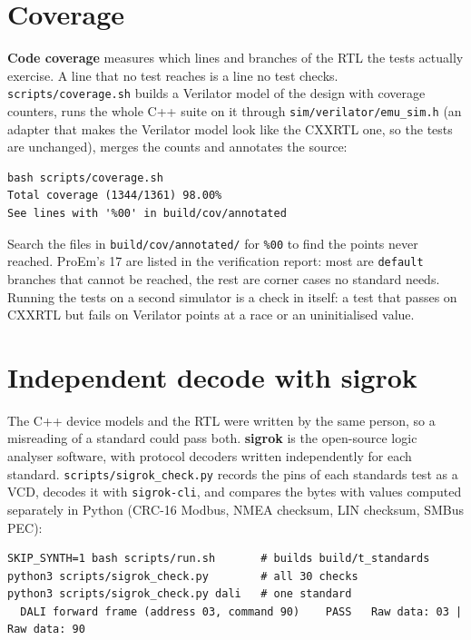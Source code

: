 \documentclass[11pt,a4paper]{article}
\newcommand{\file}[1]{\texttt{#1}}
\newcommand{\cmd}[1]{\texttt{#1}}
\begin{document}
\section{Coverage}\label{sec:coverage}

\textbf{Code coverage} measures which lines and branches of the RTL the tests actually exercise. A line that no test reaches is a line no test checks. \file{scripts/coverage.sh} builds a Verilator model of the design with coverage counters, runs the whole C++ suite on it through \file{sim/verilator/emu\_sim.h} (an adapter that makes the Verilator model look like the CXXRTL one, so the tests are unchanged), merges the counts and annotates the source:

\begin{lstlisting}
bash scripts/coverage.sh
Total coverage (1344/1361) 98.00%
See lines with '%00' in build/cov/annotated
\end{lstlisting}

Search the files in \file{build/cov/annotated/} for \texttt{\%00} to find the points never reached. ProEm's 17 are listed in the verification report: most are \texttt{default} branches that cannot be reached, the rest are corner cases no standard needs. Running the tests on a second simulator is a check in itself: a test that passes on CXXRTL but fails on Verilator points at a race or an uninitialised value.

\section{Independent decode with sigrok}\label{sec:sigrok}

The C++ device models and the RTL were written by the same person, so a misreading of a standard could pass both. \textbf{sigrok} is the open-source logic analyser software, with protocol decoders written independently for each standard. \file{scripts/sigrok\_check.py} records the pins of each standards test as a VCD, decodes it with \cmd{sigrok-cli}, and compares the bytes with values computed separately in Python (CRC-16 Modbus, NMEA checksum, LIN checksum, SMBus PEC):

\begin{lstlisting}
SKIP_SYNTH=1 bash scripts/run.sh       # builds build/t_standards
python3 scripts/sigrok_check.py        # all 30 checks
python3 scripts/sigrok_check.py dali   # one standard
  DALI forward frame (address 03, command 90)    PASS   Raw data: 03 | Raw data: 90
\end{lstlisting}
\end{document}
